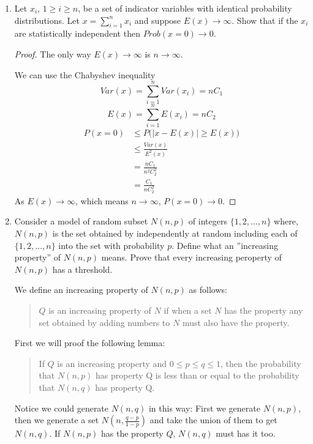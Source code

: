 \documentclass[a4paper, 12pt]{mcshw}
\begin{document}
\begin{enumerate}
    \item Let $x_i$, $1 \geq i \geq n$, be a set of indicator variables with identical probability distributions. Let $x = \sum_{i = 1}^{n}x_i$ and suppose $E(x) \to \infty$. Show that if the $x_i$ are statistically independent then $Prob(x = 0) \to 0$.
        \begin{proof}
            The only way $E(x)\to\infty$ is $n\to\infty$. 

            We can use the Chabyshev inequality
            $$Var(x) = \sum_{i = 1}^{n}Var(x_i) = nC_1$$
            $$E(x) = \sum_{i = 1}^{n}E(x_i) = nC_2$$
            \begin{align*}
                P(x = 0) &\leq P\bigl(|x - E(x)| \geq E(x)\bigr)\\
                &\leq \frac{Var(x)}{E^2(x)}\\
                &= \frac{nC_1}{n^2C_2^2}\\
                &= \frac{C_1}{nC_2^2}
            \end{align*}
            As $E(x) \to \infty$, which means $n\to\infty$, $P(x = 0) \to 0$.

        \end{proof}
    \item Consider a model of random subset $N(n, p)$ of integers $\{1, 2, \dots, n\}$ where, $N(n, p)$ is the set obtained by independently at random including each of $\{1, 2, \dots, n\}$ into the set with probability $p$. Define what an ''increasing property'' of $N(n, p)$ means. Prove that every increasing peroperty of $N(n, p)$ has a threshold.
        \begin{solution}
            We define an increasing property of $N(n, p)$ as follows: 
            \begin{quote}
                $Q$ is an increasing property of $N$ if when a set $N$ has the property any set obtained by adding numbers to $N$ must also have the property.
            \end{quote}
            First we will proof the following lemma: 
            \begin{quote}
                If $Q$ is an increasing property and $0 \leq p \leq q \leq 1$, then the probability that $N(n, p)$ has property Q is less than or equal to the probability that $N(n, q)$ has property Q.
            \end{quote}
            Notice we could generate $N(n, q)$ in this way: First we generate $N(n, p)$, then we generate a set $N(n, \frac{q - p}{1 - p})$ and take the union of them to get $N(n, q)$. If $N(n, p)$ has the property $Q$, $N(n, q)$ must has it too. 


\end{solution}
\end{enumerate}
\end{document}
